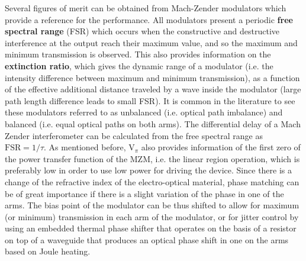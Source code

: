 
Several figures of merit can be obtained from Mach-Zender modulators which provide a reference for the performance. All modulators present a periodic \textbf{free spectral range} (FSR) which occurs when the constructive and destructive interference at the output reach their maximum value, and so the maximum and minimum transmission is observed. This also provides information on the \textbf{extinction ratio}, which gives the dynamic range of a modulator (i.e. the intensity difference between maximum and minimum transmission), as a function of the effective additional distance traveled by a wave inside the modulator (large path length difference leads to small FSR). It is common in the literature to see these modulators referred to as unbalanced (i.e. optical path imbalance) and balanced (i.e. equal optical paths on both arms). The differential delay of a Mach Zender interferometer can be calculated from the free spectral range as $\text{FSR}=1/\tau$. As mentioned before, $\text{V}_\pi$ also provides information of the first zero of the power transfer function of the MZM, i.e. the linear region operation, which is preferably low in order to use low power for driving the device. Since there is a change of the refractive index of the electro-optical material, phase matching can be of great importance if there is a slight variation of the phase in one of the arms. The bias point of the modulator can be thus shifted to allow for maximum (or minimum) transmission in each arm of the modulator, or for jitter control by using an embedded thermal phase shifter that operates on the basis of a resistor on top of a waveguide that produces an optical phase shift in one on the arms based on Joule heating.





